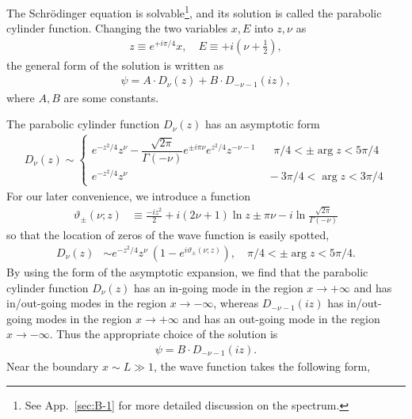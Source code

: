 \documentclass[a4paper,11pt]{article}
\begin{document}
The Schr\"{o}dinger equation is solvable\footnote{
See App.~\ref{sec:B-1} for more detailed discussion on the spectrum.
}, and 
its solution is called the parabolic cylinder function.
Changing the two variables $x, E$ into $z,\nu$ as
\begin{align}
    z \equiv e^{+i\pi/4}x, \quad
    E \equiv +i\left( \nu+\frac{1}{2} \right),
\end{align}
the general form of the solution is written as
\begin{align}
    \psi = A\cdot D_{\nu}(z) + B\cdot D_{-\nu-1}(iz),
\end{align}
where $A,B$ are some constants.



The parabolic cylinder function $D_{\nu}(z)$ has an asymptotic form
\begin{align}
    \label{eq:para_cylinder_asymp}
    D_{\nu}(z)
    \sim \left\{
    \begin{array}{ll}
        e^{-z^2/4} z^{\nu}
        -\dfrac{\sqrt{2\pi}}{\Gamma(-\nu)} e^{\pm i\pi\nu}
        e^{z^2/4} z^{-\nu-1} &
        \;\;\; \pi/4 < \pm\arg z < 5\pi/4 \\
        e^{-z^2/4} z^{\nu} &
        \;-3\pi/4 < \arg z < 3\pi/4
    \end{array}
    \right.
\end{align}
For our later convenience, we introduce a function
\begin{align}
    \vartheta_{\pm}(\nu;z)
    &\equiv  \frac{-iz^2}{2} + i(2\nu+1)\ln z
    \pm\pi\nu -i\ln\frac{\sqrt{2\pi}}{\Gamma(-\nu)}
\end{align}
so that the location of zeros of the wave function is easily spotted,
\begin{align}
    D_{\nu}(z)
    &\sim e^{-z^2/4}z^{\nu}\: (1-e^{i\vartheta_{\pm}(\nu;z)}), \quad
    \pi/4 < \pm\arg z < 5\pi/4.
\end{align}
By using the form of the asymptotic expansion,
we find that the parabolic cylinder function $D_{\nu}(z)$
has an in-going mode in the region $x\rightarrow+\infty$
and has in/out-going modes in the region $x\rightarrow-\infty$,
whereas $D_{-\nu-1}(iz)$
has in/out-going modes in the region $x\rightarrow+\infty$
and has an out-going mode in the region $x\rightarrow-\infty$.
Thus the appropriate choice of the solution is
\begin{align}
    \psi = B\cdot D_{-\nu-1}(iz).
\end{align}
Near the boundary $x \sim L \gg 1$,
the wave function takes the following form,
\end{document}
